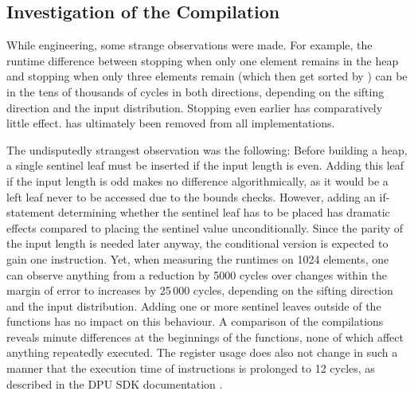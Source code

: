 \subsection*{Investigation of the Compilation}
\label{sec:tasklet:heap:compilation}

While engineering, some strange observations were made.
For example, the runtime difference between stopping \HS{} when only one element remains in the heap and stopping \HS{} when only three elements remain (which then get sorted by \IS{}) can be in the tens of thousands of cycles in both directions, depending on the sifting direction and the input distribution.
Stopping \HS{} even earlier has comparatively little effect.
\IS{} has ultimately been removed from all implementations.

The undisputedly strangest observation was the following:
Before building a heap, a single sentinel leaf must be inserted if the input length is even.
Adding this leaf if the input length is odd makes no difference algorithmically, as it would be a left leaf never to be accessed due to the bounds checks.
However, adding an if-statement determining whether the sentinel leaf has to be placed has dramatic effects compared to placing the sentinel value unconditionally.
Since the parity of the input length is needed later anyway, the conditional version is expected to gain one instruction.
Yet, when measuring the runtimes on 1024 elements, one can observe anything from a reduction by 5000 cycles over changes within the margin of error to increases by 25\,000 cycles, depending on the sifting direction and the input distribution.
Adding one or more sentinel leaves outside of the \HS{} functions has no impact on this behaviour.
A comparison of the compilations reveals minute differences at the beginnings of the \HS{} functions, none of which affect anything repeatedly executed.
The register usage does also not change in such a manner that the execution time of instructions is prolonged to 12 cycles, as described in the DPU SDK documentation \cite[Instruction Set Architecture -- Efficient scheduling]{upmemSDK}.
